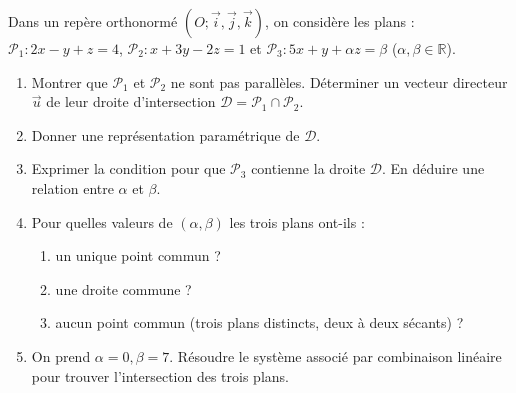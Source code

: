 \documentclass[11pt]{article}
\begin{document}
\begin{exercice}
Dans un repère orthonormé $(O; \vec{i}, \vec{j}, \vec{k})$, on considère les plans :
$\mathcal{P}_1 : 2x - y + z = 4$, $\mathcal{P}_2 : x + 3y - 2z = 1$ et $\mathcal{P}_3 : 5x + y + \alpha z = \beta$ ($\alpha, \beta \in \mathbb{R}$).
\begin{enumerate}
    \item Montrer que $\mathcal{P}_1$ et $\mathcal{P}_2$ ne sont pas parallèles. Déterminer un vecteur directeur $\vec{u}$ de leur droite d'intersection $\mathcal{D} = \mathcal{P}_1 \cap \mathcal{P}_2$.
    \item Donner une représentation paramétrique de $\mathcal{D}$.
    \item Exprimer la condition pour que $\mathcal{P}_3$ contienne la droite $\mathcal{D}$. En déduire une relation entre $\alpha$ et $\beta$.
    \item Pour quelles valeurs de $(\alpha, \beta)$ les trois plans ont-ils :
    \begin{enumerate}
        \item un unique point commun ?
        \item une droite commune ?
        \item aucun point commun (trois plans distincts, deux à deux sécants) ?
    \end{enumerate}
    \item On prend $\alpha = 0, \beta = 7$. Résoudre le système associé par combinaison linéaire pour trouver l'intersection des trois plans.
\end{enumerate}
\end{exercice}
\end{document}
